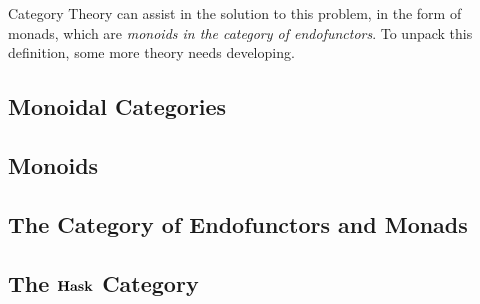 \documentclass[10pt,a4paper]{amsart}
\begin{document}
Category Theory can assist in the solution to this problem, in the form of
monads, which are \emph{monoids in the category of endofunctors}. To unpack this
definition, some more theory needs developing.

\subsection{Monoidal Categories}
\subsection{Monoids}
\subsection{The Category of Endofunctors and Monads}
\subsection{The $\operatorname{\text{\textbf{Hask}}}$ Category}

\printbibliography[title=Cited Works]
\end{document}
